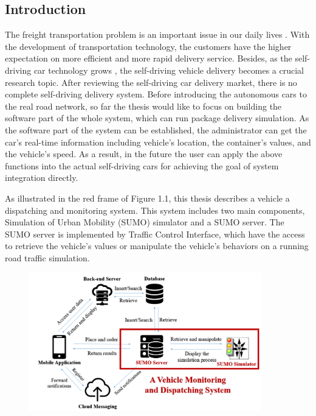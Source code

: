 \documentclass[12pt]{ksthesis}
\begin{document}
\begin{thesis}\large {
\chapter{Introduction} \label{Chap:Introduction}

The freight transportation problem is an important issue in our daily lives \cite{Anand2012}. With the development of transportation technology, the customers have the higher expectation on more efficient and more rapid delivery service. Besides, as the self-driving car technology grows \cite{Lutin2013}, the self-driving vehicle delivery becomes a crucial research topic. After reviewing the self-driving car delivery market, there is no complete self-driving delivery system. 
Before introducing the autonomous cars to the real road network, so far the thesis would like to focus on building the software part of the whole system, which can run package delivery simulation. As the software part of the system can be established, the administrator can get the car’s real-time information including vehicle’s location, the container’s values, and the vehicle’s speed. As a result, in the future the user can apply the above functions into the actual self-driving cars for achieving the goal of system integration directly.

As illustrated in the red frame of Figure 1.1, this thesis describes a vehicle a dispatching and monitoring system. This system includes two main components, Simulation of Urban Mobility (SUMO) simulator and a SUMO server. The SUMO server is implemented by Traffic Control Interface, which have the access to retrieve the vehicle’s values or manipulate the vehicle’s behaviors on a running road traffic simulation.

\begin{figure}[t]
\centering
\includegraphics[width=0.9\textwidth]{./Thesis_figures/F1-1_System_Design_Overview.PNG}


\end{figure}}
\end{thesis}
\end{document}
